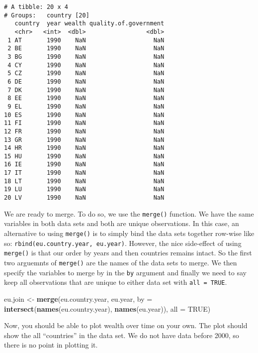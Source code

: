 \documentclass[]{article}
\newenvironment{Shaded}{\begin{snugshade}}{\end{snugshade}}
\newcommand{\DataTypeTok}[1]{\textcolor[rgb]{0.13,0.29,0.53}{#1}}
\newcommand{\KeywordTok}[1]{\textcolor[rgb]{0.13,0.29,0.53}{\textbf{#1}}}
\newcommand{\NormalTok}[1]{#1}
\newcommand{\OtherTok}[1]{\textcolor[rgb]{0.56,0.35,0.01}{#1}}
\newcommand{\StringTok}[1]{\textcolor[rgb]{0.31,0.60,0.02}{#1}}
\begin{document}
\begin{verbatim}
# A tibble: 20 x 4
# Groups:   country [20]
   country  year wealth quality.of.government
   <chr>   <int>  <dbl>                 <dbl>
 1 AT       1990    NaN                   NaN
 2 BE       1990    NaN                   NaN
 3 BG       1990    NaN                   NaN
 4 CY       1990    NaN                   NaN
 5 CZ       1990    NaN                   NaN
 6 DE       1990    NaN                   NaN
 7 DK       1990    NaN                   NaN
 8 EE       1990    NaN                   NaN
 9 EL       1990    NaN                   NaN
10 ES       1990    NaN                   NaN
11 FI       1990    NaN                   NaN
12 FR       1990    NaN                   NaN
13 GR       1990    NaN                   NaN
14 HR       1990    NaN                   NaN
15 HU       1990    NaN                   NaN
16 IE       1990    NaN                   NaN
17 IT       1990    NaN                   NaN
18 LT       1990    NaN                   NaN
19 LU       1990    NaN                   NaN
20 LV       1990    NaN                   NaN
\end{verbatim}

We are ready to merge. To do so, we use the \texttt{merge()} function. We have the same variables in both data sets and both are unique observations. In this case, an alternative to using \texttt{merge()} is to simply bind the data sets together row-wise like so: \texttt{rbind(eu.country.year,\ eu.year)}. However, the nice side-effect of using \texttt{merge()} is that our order by years and then countries remains intact. So the first two arguemnts of \texttt{merge()} are the names of the data sets to merge. We then specify the variables to merge by in the \texttt{by} argument and finally we need to say keep all observations that are unique to either data set with \texttt{all\ =\ TRUE}.

\begin{Shaded}
\begin{Highlighting}[]
\NormalTok{eu.join <-}\StringTok{ }\KeywordTok{merge}\NormalTok{(eu.country.year, eu.year, }\DataTypeTok{by =} \KeywordTok{intersect}\NormalTok{(}\KeywordTok{names}\NormalTok{(eu.country.year), }\KeywordTok{names}\NormalTok{(eu.year)), }\DataTypeTok{all =} \OtherTok{TRUE}\NormalTok{)}
\end{Highlighting}
\end{Shaded}

Now, you should be able to plot wealth over time on your own. The plot should show the all ``countries'' in the data set. We do not have data before 2000, so there is no point in plotting it.
\end{document}
